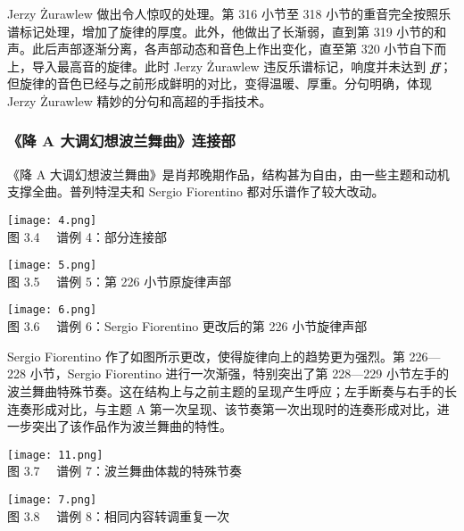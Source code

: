     Jerzy Żurawlew 做出令人惊叹的处理。第 316 小节至 318 小节的重音完全按照乐谱标记处理，增加了旋律的厚度。此外，他做出了长渐弱，直到第 319 小节的和声。此后声部逐渐分离，各声部动态和音色上作出变化，直至第 320 小节自下而上，导入最高音的旋律。此时 Jerzy Żurawlew 违反乐谱标记，响度并未达到 \textit{\textbf{ff}}；但旋律的音色已经与之前形成鲜明的对比，变得温暖、厚重。分句明确，体现 Jerzy Żurawlew 精妙的分句和高超的手指技术。

    \subsubsection{\heiti \fontsize{14}{16.8}\selectfont 《降 A 大调幻想波兰舞曲》连接部}
    《降 A 大调幻想波兰舞曲》是肖邦晚期作品，结构甚为自由，由一些主题和动机支撑全曲。普列特涅夫和 Sergio Fiorentino 都对乐谱作了较大改动。


    \begin{center}\texttt{[image: 4.png]}\\
    \heiti \fontsize{10.5}{12.6}\selectfont 图 3.4 \ \ 谱例 4：部分连接部
    \end{center}
    \begin{center}\texttt{[image: 5.png]}\\
    \heiti \fontsize{10.5}{12.6}\selectfont 图 3.5 \ \ 谱例 5：第 226 小节原旋律声部
    \end{center}
    \begin{center}\texttt{[image: 6.png]}\\
    \heiti \fontsize{10.5}{12.6}\selectfont 图 3.6 \ \ 谱例 6：Sergio Fiorentino 更改后的第 226 小节旋律声部
    \end{center}

    Sergio Fiorentino 作了如图所示更改，使得旋律向上的趋势更为强烈。第 226—228 小节，Sergio Fiorentino 进行一次渐强，特别突出了第 228—229 小节左手的波兰舞曲特殊节奏。这在结构上与之前主题的呈现产生呼应；左手断奏与右手的长连奏形成对比，与主题 A 第一次呈现、该节奏第一次出现时的连奏形成对比，进一步突出了该作品作为波兰舞曲的特性。

    \begin{center}\texttt{[image: 11.png]}\\
    \heiti \fontsize{10.5}{12.6}\selectfont 图 3.7 \ \ 谱例 7：波兰舞曲体裁的特殊节奏
    \end{center}
    \begin{center}\texttt{[image: 7.png]}\\
    \heiti \fontsize{10.5}{12.6}\selectfont 图 3.8 \ \ 谱例 8：相同内容转调重复一次
    \end{center}

